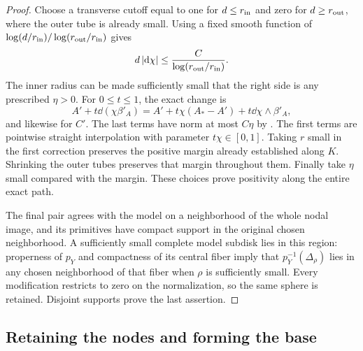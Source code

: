\begin{proof}
Choose a transverse cutoff equal to one for $d\leq r_{\rm in}$ and
zero for $d\geq r_{\rm out}$, where the outer tube is already small.
Using a fixed smooth function of
$\log(d/r_{\rm in})/\log(r_{\rm out}/r_{\rm in})$ gives
\begin{equation}\label{eq:pencil-log-cutoff}
 d\,|\mathrm d\chi|\leq
 \frac{C}{\log(r_{\rm out}/r_{\rm in})}.
\end{equation}
The inner radius can be made sufficiently small that the right
side is any prescribed $\eta>0$.  For $0\leq t\leq1$, the exact
change is
\[
 A'+t\dd(\chi\beta'_A)
  =A'+t\chi(A_*-A')+t\dd\chi\wedge\beta'_A,
\]
and likewise for $C'$.  The last terms have norm at most $C\eta$
by .
The first terms are pointwise straight interpolation with parameter
$t\chi\in[0,1]$.  Taking $r$ small in the first correction preserves
the positive margin already established along $K$.  Shrinking the
outer tubes preserves that margin throughout them.  Finally take
$\eta$ small compared with the margin.  These choices prove
positivity along the entire exact path.

The final pair agrees with the model on a neighborhood of the whole
nodal image, and its primitives have compact support in the original
chosen neighborhood.  A sufficiently small complete model subdisk
lies in this region: properness of $p_Y$ and compactness of its
central fiber imply that $p_Y^{-1}(\Delta_\rho)$ lies in any chosen
neighborhood of that fiber when $\rho$ is sufficiently small.
Every modification restricts to zero on the normalization, so the
same sphere is retained.  Disjoint supports prove the last assertion.
\end{proof}

\subsection{Retaining the nodes and forming the base}

